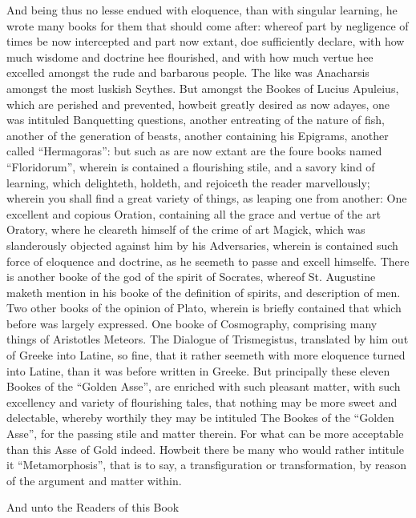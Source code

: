 And being thus no lesse endued with eloquence, than with singular learning, he
wrote many books for them that should come after: whereof part by negligence of
times be now intercepted and part now extant, doe sufficiently declare, with
how much wisdome and doctrine hee flourished, and with how much vertue hee
excelled amongst the rude and barbarous people. The like was Anacharsis amongst
the most luskish Scythes. But amongst the Bookes of Lucius Apuleius, which are
perished and prevented, howbeit greatly desired as now adayes, one was
intituled Banquetting questions, another entreating of the nature of fish,
another of the generation of beasts, another containing his Epigrams, another
called “Hermagoras”: but such as are now extant are the foure books
named “Floridorum”, wherein is contained a flourishing stile, and a
savory kind of learning, which delighteth, holdeth, and rejoiceth the reader
marvellously; wherein you shall find a great variety of things, as leaping one
from another: One excellent and copious Oration, containing all the grace and
vertue of the art Oratory, where he cleareth himself of the crime of art
Magick, which was slanderously objected against him by his Adversaries, wherein
is contained such force of eloquence and doctrine, as he seemeth to passe and
excell himselfe. There is another booke of the god of the spirit of Socrates,
whereof St. Augustine maketh mention in his booke of the definition of spirits,
and description of men. Two other books of the opinion of Plato, wherein is
briefly contained that which before was largely expressed. One booke of
Cosmography, comprising many things of Aristotles Meteors. The Dialogue of
Trismegistus, translated by him out of Greeke into Latine, so fine, that it
rather seemeth with more eloquence turned into Latine, than it was before
written in Greeke. But principally these eleven Bookes of the “Golden
Asse”, are enriched with such pleasant matter, with such excellency and
variety of flourishing tales, that nothing may be more sweet and delectable,
whereby worthily they may be intituled The Bookes of the “Golden
Asse”, for the passing stile and matter therein. For what can be more
acceptable than this Asse of Gold indeed. Howbeit there be many who would
rather intitule it “Metamorphosis”, that is to say, a
transfiguration or transformation, by reason of the argument and matter within.


And unto the Readers of this Book

